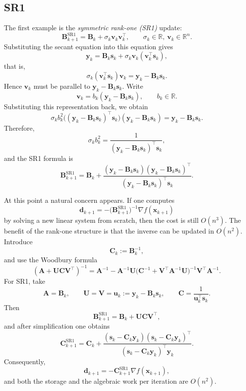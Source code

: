 \subsection{SR1}
The first example is the \emph{symmetric rank-one (SR1)} update:
\[
  \mathbf{B}_{k+1}^{\mathrm{SR1}}
  =\mathbf{B}_k+\sigma_k \mathbf{v}_k\mathbf{v}_k^\top,
  \qquad
  \sigma_k\in\mathbb{R},\ \mathbf{v}_k\in\mathbb{R}^n.
\]
Substituting the secant equation into this equation gives
\[
  \mathbf{y}_k
  =\mathbf{B}_k\mathbf{s}_k+\sigma_k \mathbf{v}_k(\mathbf{v}_k^\top \mathbf{s}_k),
\]
that is,
\[
  \sigma_k(\mathbf{v}_k^\top \mathbf{s}_k)\mathbf{v}_k
  =\mathbf{y}_k-\mathbf{B}_k\mathbf{s}_k.
\]
Hence $\mathbf{v}_k$ must be parallel to
$\mathbf{y}_k-\mathbf{B}_k\mathbf{s}_k$. Write
\[
  \mathbf{v}_k=b_k(\mathbf{y}_k-\mathbf{B}_k\mathbf{s}_k),
  \qquad
  b_k\in\mathbb{R}.
\]
Substituting this representation back, we obtain
\[
  \sigma_k b_k^2
  \bigl((\mathbf{y}_k-\mathbf{B}_k\mathbf{s}_k)^\top \mathbf{s}_k\bigr)
  (\mathbf{y}_k-\mathbf{B}_k\mathbf{s}_k)
  =\mathbf{y}_k-\mathbf{B}_k\mathbf{s}_k.
\]
Therefore,
\[
  \sigma_k b_k^2
  =\frac{1}{(\mathbf{y}_k-\mathbf{B}_k\mathbf{s}_k)^\top \mathbf{s}_k},
\]
and the SR1 formula is
\begin{equation}
  \label{eq:ch6-sr1}
  \mathbf{B}_{k+1}^{\mathrm{SR1}}
  =\mathbf{B}_k
  +\frac{(\mathbf{y}_k-\mathbf{B}_k\mathbf{s}_k)
  (\mathbf{y}_k-\mathbf{B}_k\mathbf{s}_k)^\top}
  {(\mathbf{y}_k-\mathbf{B}_k\mathbf{s}_k)^\top \mathbf{s}_k}.
\end{equation}

At this point a natural concern appears. If one computes
\[
  \mathbf{d}_{k+1}
  =-\bigl(\mathbf{B}_{k+1}^{\mathrm{SR1}}\bigr)^{-1}\nabla f(\mathbf{x}_{k+1})
\]
by solving a new linear system from scratch, then the cost is still $O(n^3)$.
The benefit of the rank-one structure is that the inverse can be updated in
$O(n^2)$. Introduce
\[
  \mathbf{C}_k:=\mathbf{B}_k^{-1},
\]
and use the Woodbury formula
\[
  (\mathbf{A}+\mathbf{U}\mathbf{C}\mathbf{V}^\top)^{-1}
  =
  \mathbf{A}^{-1}
  -\mathbf{A}^{-1}\mathbf{U}
  \bigl(\mathbf{C}^{-1}+\mathbf{V}^\top \mathbf{A}^{-1}\mathbf{U}\bigr)^{-1}
  \mathbf{V}^\top \mathbf{A}^{-1}.
\]
For SR1, take
\[
  \mathbf{A}=\mathbf{B}_k,
  \qquad
  \mathbf{U}=\mathbf{V}=\mathbf{u}_k:=\mathbf{y}_k-\mathbf{B}_k\mathbf{s}_k,
  \qquad
  \mathbf{C}=\frac{1}{\mathbf{u}_k^\top \mathbf{s}_k}.
\]
Then
\[
  \mathbf{B}_{k+1}^{\mathrm{SR1}}
  =\mathbf{B}_k+\mathbf{U}\mathbf{C}\mathbf{V}^\top,
\]
and after simplification one obtains
\begin{equation}
  \label{eq:ch6-sr1-inverse}
  \mathbf{C}_{k+1}^{\mathrm{SR1}}
  =\mathbf{C}_k
  +\frac{(\mathbf{s}_k-\mathbf{C}_k\mathbf{y}_k)
  (\mathbf{s}_k-\mathbf{C}_k\mathbf{y}_k)^\top}
  {(\mathbf{s}_k-\mathbf{C}_k\mathbf{y}_k)^\top \mathbf{y}_k}.
\end{equation}
Consequently,
\[
  \mathbf{d}_{k+1}
  =-\mathbf{C}_{k+1}^{\mathrm{SR1}}\nabla f(\mathbf{x}_{k+1}),
\]
and both the storage and the algebraic work per iteration are $O(n^2)$.

